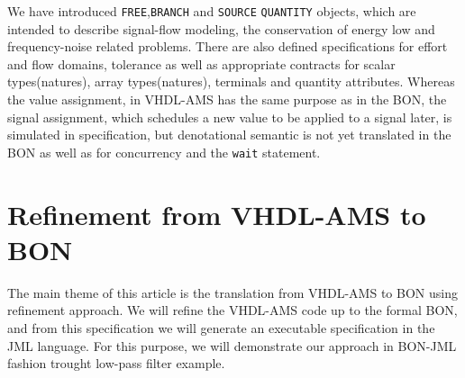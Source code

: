 \documentclass{article}
\def\lstinlinen{\lstinline[language=Bon,basicstyle=\normalsize\upshape]}
\begin{document}
We have introduced \xspace\lstinlinen|FREE|,\xspace \lstinlinen|BRANCH|
and  \xspace\lstinlinen|SOURCE| \space \lstinlinen|QUANTITY| objects, 
which are intended to describe signal-flow modeling, the 
conservation of energy low and frequency-noise related problems. 
There are also defined specifications for effort and 
flow domains, tolerance as well as appropriate contracts for 
scalar types(natures), array types(natures), 
terminals and quantity attributes.
Whereas the value assignment, in VHDL-AMS has the same purpose as in the BON,
the signal assignment, which schedules a new value to be applied to a 
signal later, is simulated in specification, but  denotational semantic
is not yet translated in the BON as well as for concurrency and 
the \texttt{wait} statement.
  
\section{Refinement from VHDL-AMS to BON }
\label{sec:refVB}
The main theme of this article is the translation from VHDL-AMS to BON using 
refinement approach.
We will refine the VHDL-AMS code up to the formal BON, and from this 
specification we will generate an executable specification in the JML language.
For this purpose, we will demonstrate our approach in BON-JML fashion trought  
low-pass filter example.\\
\end{document}
